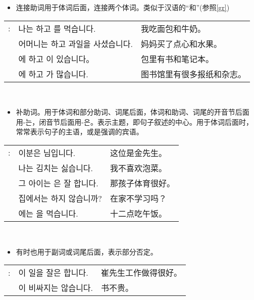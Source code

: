 \begin{grammar}
    \begin{grammarsect}[\kr -하고]
    \begin{itemize}
        \item 连接助词用于体词后面，连接两个体词。类似于汉语的“和”(参照\ref{gr})
    \end{itemize}
    \begin{tabular}{lll}
        \kr \ruby{例}{예}: &\kr 나는 \ruby{빵}{pão}하고 \ruby{牛乳}{우유}를 먹습니다.&我吃面包和牛奶。 \\
        &\kr 어머니는 \ruby{菓子}{과자}하고 과일을 사셨습니다. &妈妈买了点心和水果。\\ 
        &\kr \ruby{가방}{かばん}에 \ruby{冊}{책}하고 \ruby{空冊}{공책}이 있습니다。&包里有书和笔记本。\\
        &\kr \ruby{圖書館}{도서관}에 \ruby{新聞}{신문}하고 \ruby{雜誌}{잡지}가 많습니다.&图书馆里有很多报纸和杂志。\\
    \end{tabular}\\
    \end{grammarsect}
    \begin{grammarsect}[\kr -은/-는]
        \begin{itemize}
            \item 补助词。用于体词和部分助词、词尾后面，体词和助词、词尾的开音节后面用{\kr -는}，闭音节后面用{\kr -은}。表示主题，即句子叙述的中心。用于体词后面时，常常表示句子的主语，或是强调的宾语。
        \end{itemize}
        \begin{tabular}{lll}
            \kr \ruby{例}{예}: &\kr 이분은 \ruby{金}{김} \ruby{先生}{선생}님입니다.&这位是金先生。\\
            &\kr 나는 김치는 싫습니다.&我不喜欢泡菜。\\
            &\kr 그 아이는 \ruby{運動}{운동}은 잘 합니다.&那孩子体育很好。\\
            &\kr 집에서는 \ruby{工夫}{공부}하지 않습니까?&在家不学习吗？\\
            &\kr \ruby{12}{열두}\ruby{時}{시}에는 \ruby{點心}{점심}을 먹습니다.&十二点吃午饭。
        \end{tabular}\\
        \begin{itemize}
            \item 有时也用于副词或词尾后面，表示部分否定。
        \end{itemize}
        \begin{tabular}{lll}
            \kr \ruby{例}{예}: &\kr \ruby{崔}{최} \ruby{先生}{선생}이 일을 잘은 합니다.&崔先生工作做得很好。\\
            &\kr \ruby{冊}{책}이 비싸지는 않습니다.&书不贵。
        \end{tabular}\\
    \end{grammarsect}
\end{grammar}
